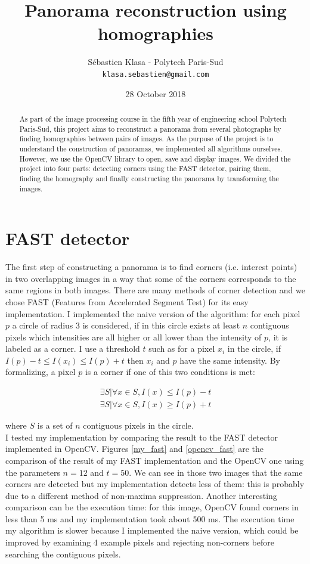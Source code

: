 \documentclass[a4paper,twocolumn]{article}
\title{Panorama reconstruction using homographies}
\author{
	Sébastien Klasa - Polytech Paris-Sud\\
	\texttt{klasa.sebastien@gmail.com}
}
\date{28 October 2018}
\begin{document}
	
\maketitle

\begin{abstract}
	As part of the image processing course in the fifth year of engineering school Polytech Paris-Sud, this project aims to reconstruct a panorama from several photographs by finding homographies between pairs of images. As the purpose of the project is to understand the construction of panoramas, we implemented all algorithms ourselves. However, we use the OpenCV library to open, save and display images. We divided the project into four parts: detecting corners using the FAST detector, pairing them, finding the homography and finally constructing the panorama by transforming the images.
\end{abstract}

\section{FAST detector}

The first step of constructing a panorama is to find corners (i.e. interest points) in two overlapping images in a way that some of the corners corresponds to the same regions in both images. There are many methods of corner detection and we chose FAST (Features from Accelerated Segment Test) for its easy implementation. I implemented the naive version of the algorithm: for each pixel $p$ a circle of radius 3 is considered, if in this circle exists at least $n$ contiguous pixels which intensities are all higher or all lower than the intensity of $p$, it is labeled as a corner. I use a threshold $t$ such as for a pixel $x_i$ in the circle, if $I(p) - t \le I(x_i) \le I(p) + t$ then $x_i$ and $p$ have the same intensity. By formalizing, a pixel $p$ is a corner if one of this two conditions is met:

\begin{align*}
\exists S | \forall x \in S, I(x) \le I(p) - t\\
\exists S | \forall x \in S, I(x) \ge I(p) + t
\end{align*}

where $S$ is a set of $n$ contiguous pixels in the circle.
\\

I tested my implementation by comparing the result to the FAST detector implemented in OpenCV. Figures \ref{my_fast} and \ref{opencv_fast} are the comparison of the result of my FAST implementation and the OpenCV one using the parameters $n = 12$ and $t = 50$. We can see in those two images that the same corners are detected but my implementation detects less of them: this is probably due to a different method of non-maxima suppression. Another interesting comparison can be the execution time: for this image, OpenCV found corners in less than 5 ms and my implementation took about 500 ms. The execution time my algorithm is slower because I implemented the naive version, which could be improved by examining 4 example pixels and rejecting non-corners before searching the contiguous pixels.
\end{document}
